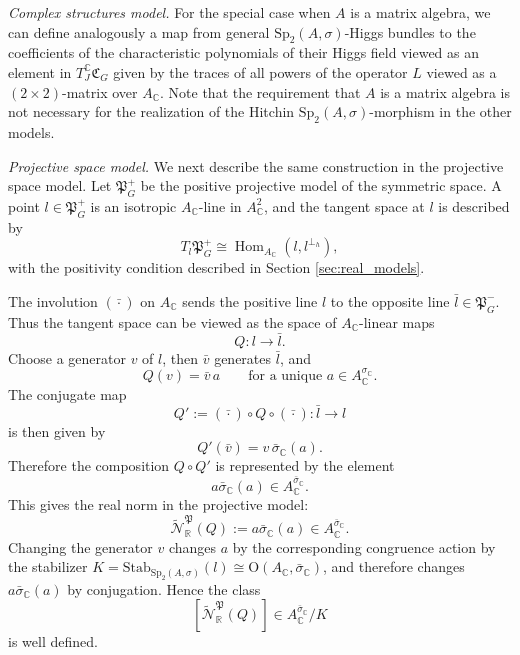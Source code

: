 \documentclass[oneside,11pt]{amsart}
\theoremstyle{definition}
\theoremstyle{remark}
\numberwithin{thm}{section}
\numberwithin{equation}{section}
\begin{document}
\vspace{2mm}


\noindent \textit{Complex structures model.}
For the special case when $A$ is a matrix algebra, we can define analogously a map from general $\mathrm{Sp}_2(A,\sigma)$-Higgs bundles to the coefficients of the characteristic polynomials of their Higgs field viewed as an element in $T^{\mathbb{C}}_J\mathfrak{C}_G$ given by the traces of all powers of the operator $L$ viewed as a $(2 \times 2)$-matrix over $A_{\mathbb{C}}$. Note that the requirement that $A$ is a matrix algebra is not necessary for the realization of the Hitchin $\mathrm{Sp}_2(A,\sigma)$-morphism in the other models.


\vspace{2mm}

\noindent \textit{Projective space model.}
We next describe the same construction in the projective space model. Let $\mathfrak P_G^+$ be the positive projective model of the symmetric space. A point $l\in\mathfrak P_G^+$ is an isotropic $A_{\mathbb C}$-line
in $A_{\mathbb C}^2$, and the tangent space at $l$ is described by
\[
T_l\mathfrak P_G^+ \cong
\operatorname{Hom}_{A_{\mathbb C}}(l,l^{\perp_h}),
\]
with the positivity condition described in Section \ref{sec:real_models}.

The involution $(\bar{\cdot})$ on $A_{\mathbb C}$ sends the positive line $l$ to the opposite line $\bar l\in\mathfrak P_G^-$. Thus the tangent space can be viewed as the space of $A_{\mathbb C}$-linear maps
\[
Q:l\longrightarrow \bar l.
\]
Choose a generator $v$ of $l$, then $\bar v$ generates $\bar l$, and
\[
Q(v)=\bar v\,a\qquad \text{for a unique } a\in A_{\mathbb C}^{\sigma_{\mathbb C}}.
\]
The conjugate map
\[
Q':=(\bar{\cdot})\circ Q\circ (\bar{\cdot}) : \bar l\longrightarrow l
\]
is then given by
\[
Q'(\bar v)=v\,\bar\sigma_{\mathbb C}(a).
\]
Therefore the composition $Q\circ Q'$ is represented by the element
\[
a\bar\sigma_{\mathbb C}(a)\in A_{\mathbb C}^{\bar\sigma_{\mathbb C}}.
\]
This gives the real norm in the projective model:
\[
\widetilde{\mathcal N}_{\mathbb R}^{\mathfrak P}(Q)
:= a\bar\sigma_{\mathbb C}(a) \in A_{\mathbb C}^{\bar\sigma_{\mathbb C}}.
\]
Changing the generator $v$ changes $a$ by the corresponding congruence action by the stabilizer $K=\mathrm{Stab}_{\mathrm{Sp}_2(A,\sigma)}(l)
\cong \mathrm{O}(A_{\mathbb C},\bar\sigma_{\mathbb C})$, and therefore changes $a\bar\sigma_{\mathbb C}(a)$ by conjugation. Hence the class
\[
[\widetilde{\mathcal N}_{\mathbb R}^{\mathfrak P}(Q)]
\in A_{\mathbb C}^{\bar\sigma_{\mathbb C}}/K
\]
is well defined.
\end{document}
